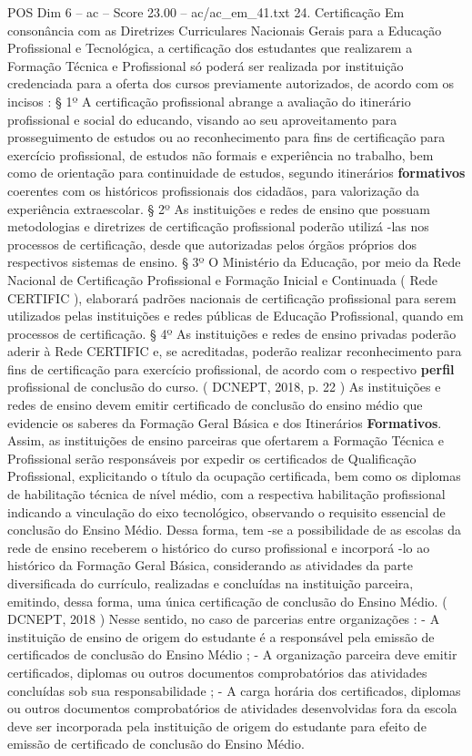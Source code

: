 \begin{textsample}{POS Dim 6 – ac – Score 23.00 – ac/ac\_em\_41.txt}  \label{ex:f6_pos_151}
24.
Certificação Em consonância com as Diretrizes Curriculares Nacionais Gerais para a Educação Profissional e Tecnológica, a certificação dos estudantes que realizarem a Formação Técnica e Profissional só poderá ser realizada por instituição credenciada para a oferta dos cursos previamente autorizados, de acordo com os incisos : § 1º A certificação profissional abrange a avaliação do itinerário profissional e social do educando, visando ao seu aproveitamento para prosseguimento de estudos ou ao reconhecimento para fins de certificação para exercício profissional, de estudos não formais e experiência no trabalho, bem como de orientação para continuidade de estudos, segundo itinerários \textbf{formativos} coerentes com os históricos profissionais dos cidadãos, para valorização da experiência extraescolar. § 2º As instituições e redes de ensino que possuam metodologias e diretrizes de certificação profissional poderão utilizá -las nos processos de certificação, desde que autorizadas pelos órgãos próprios dos respectivos sistemas de ensino. § 3º O Ministério da Educação, por meio da Rede Nacional de Certificação Profissional e Formação Inicial e Continuada ( Rede CERTIFIC ), elaborará padrões nacionais de certificação profissional para serem utilizados pelas instituições e redes públicas de Educação Profissional, quando em processos de certificação. § 4º As instituições e redes de ensino privadas poderão aderir à Rede CERTIFIC e, se acreditadas, poderão realizar reconhecimento para fins de certificação para exercício profissional, de acordo com o respectivo \textbf{perfil} profissional de conclusão do curso. ( DCNEPT, 2018, p. 22 ) As instituições e redes de ensino devem emitir certificado de conclusão do ensino médio que evidencie os saberes da Formação Geral Básica e dos Itinerários \textbf{Formativos}.
Assim, as instituições de ensino parceiras que ofertarem a Formação Técnica e Profissional serão responsáveis por expedir os certificados de Qualificação Profissional, explicitando o título da ocupação certificada, bem como os diplomas de habilitação técnica de nível médio, com a respectiva habilitação profissional indicando a vinculação do eixo tecnológico, observando o requisito essencial de conclusão do Ensino Médio.
Dessa forma, tem -se a possibilidade de as escolas da rede de ensino receberem o histórico do curso profissional e incorporá -lo ao histórico da Formação Geral Básica, considerando as atividades da parte diversificada do currículo, realizadas e concluídas na instituição parceira, emitindo, dessa forma, uma única certificação de conclusão do Ensino Médio. ( DCNEPT, 2018 ) Nesse sentido, no caso de parcerias entre organizações : - A instituição de ensino de origem do estudante é a responsável pela emissão de certificados de conclusão do Ensino Médio ; - A organização parceira deve emitir certificados, diplomas ou outros documentos comprobatórios das atividades concluídas sob sua responsabilidade ; - A carga horária dos certificados, diplomas ou outros documentos comprobatórios de atividades desenvolvidas fora da escola deve ser incorporada pela instituição de origem do estudante para efeito de emissão de certificado de conclusão do Ensino Médio.

\end{textsample}

